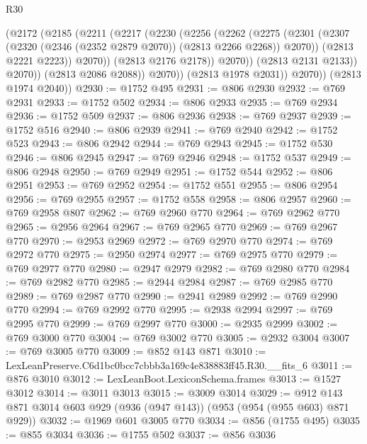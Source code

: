 \begin{lexlean}{R30}
\begin{coremodule}
                    (@2172
                      (@2185
                        (@2211
                          (@2217
                            (@2230
                              (@2256
                                (@2262
                                  (@2275
                                    (@2301
                                      (@2307
                                        (@2320 (@2346 (@2352 @2879 @2070)) (@2813 @2266 @2268))
                                        @2070))
                                    (@2813 @2221 @2223))
                                  @2070))
                              (@2813 @2176 @2178))
                            @2070))
                        (@2813 @2131 @2133))
                      @2070))
                  (@2813 @2086 @2088))
                @2070))
            (@2813 @1978 @2031))
          @2070))
      (@2813 @1974 @2040))
@2930 := @1752 @495
@2931 := @806 @2930
@2932 := @769 @2931
@2933 := @1752 @502
@2934 := @806 @2933
@2935 := @769 @2934
@2936 := @1752 @509
@2937 := @806 @2936
@2938 := @769 @2937
@2939 := @1752 @516
@2940 := @806 @2939
@2941 := @769 @2940
@2942 := @1752 @523
@2943 := @806 @2942
@2944 := @769 @2943
@2945 := @1752 @530
@2946 := @806 @2945
@2947 := @769 @2946
@2948 := @1752 @537
@2949 := @806 @2948
@2950 := @769 @2949
@2951 := @1752 @544
@2952 := @806 @2951
@2953 := @769 @2952
@2954 := @1752 @551
@2955 := @806 @2954
@2956 := @769 @2955
@2957 := @1752 @558
@2958 := @806 @2957
@2960 := @769 @2958 @807
@2962 := @769 @2960 @770
@2964 := @769 @2962 @770
@2965 := @2956 @2964
@2967 := @769 @2965 @770
@2969 := @769 @2967 @770
@2970 := @2953 @2969
@2972 := @769 @2970 @770
@2974 := @769 @2972 @770
@2975 := @2950 @2974
@2977 := @769 @2975 @770
@2979 := @769 @2977 @770
@2980 := @2947 @2979
@2982 := @769 @2980 @770
@2984 := @769 @2982 @770
@2985 := @2944 @2984
@2987 := @769 @2985 @770
@2989 := @769 @2987 @770
@2990 := @2941 @2989
@2992 := @769 @2990 @770
@2994 := @769 @2992 @770
@2995 := @2938 @2994
@2997 := @769 @2995 @770
@2999 := @769 @2997 @770
@3000 := @2935 @2999
@3002 := @769 @3000 @770
@3004 := @769 @3002 @770
@3005 := @2932 @3004
@3007 := @769 @3005 @770
@3009 := @852 @143 @871
@3010 := LexLeanPreserve.C6d1bc0bcc7cbbb3a169c4e838883ff45.R30.__fits_6
@3011 := @876 @3010
@3012 := LexLeanBoot.LexiconSchema.frames
@3013 := @1527 @3012
@3014 := @3011 @3013
@3015 := @3009 @3014
@3029 := @912 @143 @871 @3014 @603 @929 (@936 (@947 @143)) (@953 (@954 (@955 @603) @871 @929))
@3032 := @1969 @601 @3005 @770
@3034 := @856 (@1755 @495)
@3035 := @855 @3034
@3036 := @1755 @502
@3037 := @856 @3036

\end{coremodule}
\end{lexlean}
